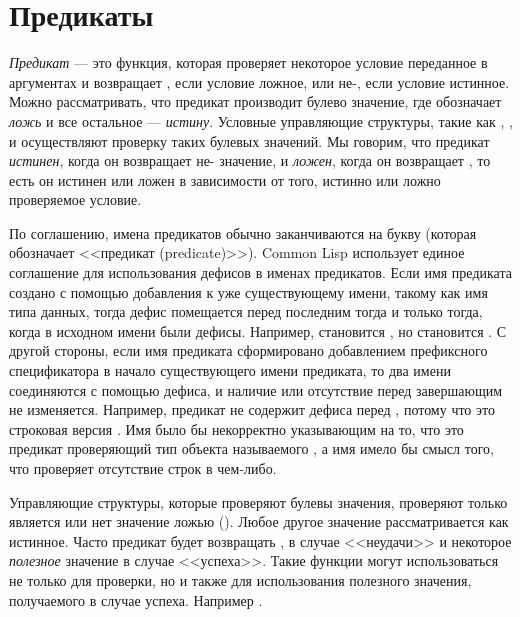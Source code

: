 \else

\chapter{Предикаты}
\label{PREDS}

\emph{Предикат} --- это функция, которая проверяет некоторое условие
переданное в аргументах и возвращает {\false}, если условие ложное, или
не-{\false}, если условие истинное. Можно рассматривать, что предикат
производит булево значение, где \cd{\false} обозначает \emph{ложь} и все
остальное --- \emph{истину}. Условные управляющие структуры, такие как
, ,  и  осуществляют проверку таких
булевых значений. 
Мы говорим, что предикат \emph{истинен}, когда он возвращает не-{\false}
значение, и \emph{ложен}, когда он возвращает {\false}, то есть он истинен
или ложен в зависимости от того, истинно или ложно проверяемое условие.

По соглашению, имена предикатов обычно заканчиваются на букву  (которая
обозначает <<предикат (predicate)>>).
Common Lisp использует единое соглашение для использования дефисов в именах
предикатов. Если имя предиката создано с помощью добавления  к уже
существующему имени, такому как имя типа данных, тогда дефис помещается перед
последним  тогда и только тогда, когда в исходном имени были
дефисы. Например,  становится , но 
становится .
С другой стороны, если имя предиката сформировано добавлением префиксного
спецификатора в начало существующего имени предиката, то два имени соединяются с
помощью дефиса, и наличие или отсутствие перед завершающим  не
изменяется. Например, предикат  не содержит дефиса перед
, потому что это строковая версия . Имя  было бы
некорректно указывающим на то, что это предикат проверяющий тип объекта
называемого , а имя  имело бы смысл того, что
проверяет отсутствие строк в чем-либо. 

Управляющие структуры, которые проверяют булевы значения, проверяют только
является или нет значение ложью ({\false}). Любое
другое значение рассматривается как истинное. Часто предикат будет возвращать
{\false}, в случае <<неудачи>> и некоторое \emph{полезное} значение в случае
<<успеха>>. Такие функции могут использоваться не только для проверки, но и
также для использования полезного значения, получаемого в случае
успеха. Например .

